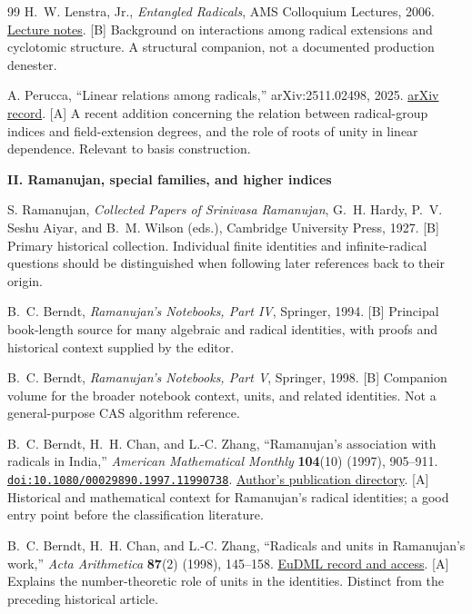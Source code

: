 \documentclass[11pt,a4paper]{article}
\numberwithin{equation}{section}
\theoremstyle{definition}\newtheorem{definition}[theorem]{Definition}
\theoremstyle{remark}\newtheorem{remark}[theorem]{Remark}
\newcommand{\doi}[1]{\href{https://doi.org/#1}{\nolinkurl{doi:#1}}}
\newcommand{\access}[2]{\href{#1}{#2}}
\newcommand{\status}[1]{\textsf{\footnotesize[#1]}}
\newcommand{\bibgroup}[1]{\par\Needspace{7\baselineskip}\bigskip\item[]\textbf{#1}\par\smallskip}
\begin{document}
\begin{thebibliography}{99}
 H.~W. Lenstra, Jr., \emph{Entangled Radicals}, AMS Colloquium Lectures, 2006.
\access{https://www.math.leidenuniv.nl/~hwl/papers/rad.pdf}{Lecture notes}. \status{B}
Background on interactions among radical extensions and cyclotomic structure. A structural companion, not a documented production denester.

 A. Perucca, ``Linear relations among radicals,'' arXiv:2511.02498, 2025.
\access{https://arxiv.org/abs/2511.02498}{arXiv record}. \status{A}
A recent addition concerning the relation between radical-group indices and field-extension degrees, and the role of roots of unity in linear dependence. Relevant to basis construction.

\bibgroup{II. Ramanujan, special families, and higher indices}

 S. Ramanujan, \emph{Collected Papers of Srinivasa Ramanujan}, G.~H. Hardy, P.~V. Seshu Aiyar, and B.~M. Wilson (eds.), Cambridge University Press, 1927. \status{B}
Primary historical collection. Individual finite identities and infinite-radical questions should be distinguished when following later references back to their origin.

 B.~C. Berndt, \emph{Ramanujan's Notebooks, Part IV}, Springer, 1994. \status{B}
Principal book-length source for many algebraic and radical identities, with proofs and historical context supplied by the editor.

 B.~C. Berndt, \emph{Ramanujan's Notebooks, Part V}, Springer, 1998. \status{B}
Companion volume for the broader notebook context, units, and related identities. Not a general-purpose CAS algorithm reference.

 B.~C. Berndt, H.~H. Chan, and L.-C. Zhang, ``Ramanujan's association with radicals in India,'' \emph{American Mathematical Monthly} \textbf{104}(10) (1997), 905--911. \doi{10.1080/00029890.1997.11990738}.
\access{https://faculty.math.illinois.edu/~berndt/publications.html}{Author's publication directory}. \status{A}
Historical and mathematical context for Ramanujan's radical identities; a good entry point before the classification literature.

 B.~C. Berndt, H.~H. Chan, and L.-C. Zhang, ``Radicals and units in Ramanujan's work,'' \emph{Acta Arithmetica} \textbf{87}(2) (1998), 145--158.
\access{https://eudml.org/doc/207210}{EuDML record and access}. \status{A}
Explains the number-theoretic role of units in the identities. Distinct from the preceding historical article.


\end{thebibliography}
\end{document}

